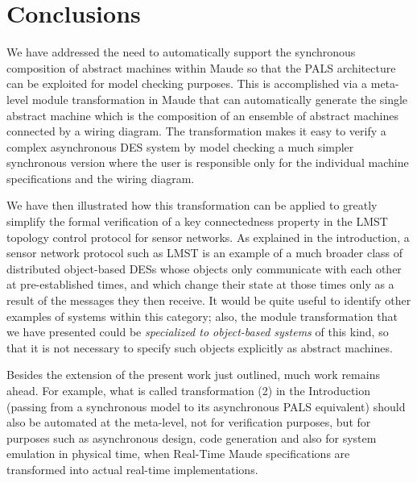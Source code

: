 \documentclass[copyright,creativecommons]{eptcs}
\begin{document}
\section{Conclusions}
\label{sec:conclusions}

We have addressed the need to automatically support the synchronous composition
of abstract machines within Maude so that the PALS architecture can be
exploited for model checking purposes.  This is accomplished via
a meta-level module transformation in Maude that can automatically generate the
single abstract machine which is the composition of an ensemble of abstract
machines connected by a wiring diagram.  The transformation makes it easy to
verify a complex asynchronous DES system by model checking a much simpler
synchronous version where the user is responsible only for the individual
machine specifications and the wiring diagram.  

We have then illustrated how this transformation can be
applied to greatly simplify the formal verification of a key connectedness
property in the LMST topology control protocol for sensor networks.  As
explained in the introduction, a sensor network protocol such as LMST is an
example of a much broader class of distributed object-based DESs whose objects
only communicate with each other at pre-established times, and which change
their state at those times only as a result of the messages they then receive.
It would be quite useful to identify other examples of systems within this
category; also, the module transformation that we have presented could be
\emph{specialized to object-based systems} of this kind, so that it is not
necessary to specify such objects explicitly as abstract machines.

Besides the extension of the present work just outlined, much work remains
ahead.  For example, what is called transformation (2) in the Introduction
(passing from a synchronous model to its asynchronous PALS equivalent) should
also be automated at the meta-level, not for verification purposes, but for
purposes such as asynchronous design, code generation and also for system
emulation in physical time, when Real-Time Maude specifications are transformed
into actual real-time implementations.

\nocite{*}
 

\end{document}
